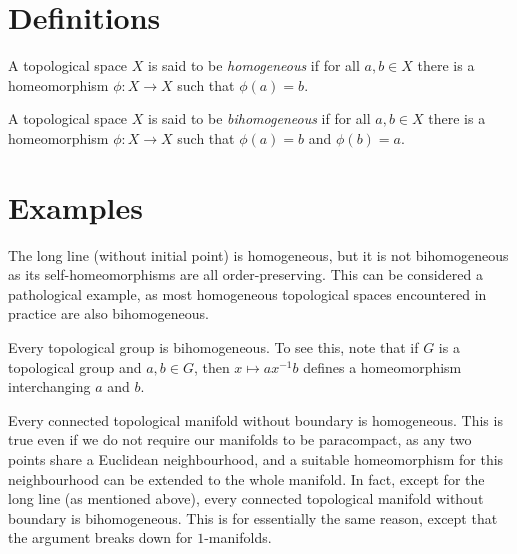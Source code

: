 \documentclass[12pt]{article}
\begin{document}

\section*{Definitions}

A topological space $X$ is said to be \emph{homogeneous}
if for all $a,b\in X$ there is a homeomorphism $\phi\colon X\to X$
such that $\phi(a)=b$.

A topological space $X$ is said to be \emph{bihomogeneous}
if for all $a,b\in X$ there is a homeomorphism $\phi\colon X\to X$
such that $\phi(a)=b$ and $\phi(b)=a$.

\section*{Examples}

The long line (without initial point) is homogeneous,
but it is not bihomogeneous
as its self-homeomorphisms are all order-preserving.
This can be considered a pathological example,
as most homogeneous topological spaces encountered in practice
are also bihomogeneous.

Every topological group is bihomogeneous.
To see this, note that if $G$ is a topological group and $a,b\in G$,
then $x\mapsto ax^{-1}b$ defines a homeomorphism interchanging $a$ and $b$.

Every connected topological manifold without boundary is homogeneous.
This is true even if we do not require our manifolds to be paracompact,
as any two points share a Euclidean neighbourhood,
and a suitable homeomorphism for this neighbourhood
can be extended to the whole manifold.
In fact, except for the long line (as mentioned above),
every connected topological manifold without boundary is bihomogeneous.
This is for essentially the same reason,
except that the argument breaks down for $1$-manifolds.

\end{document}
